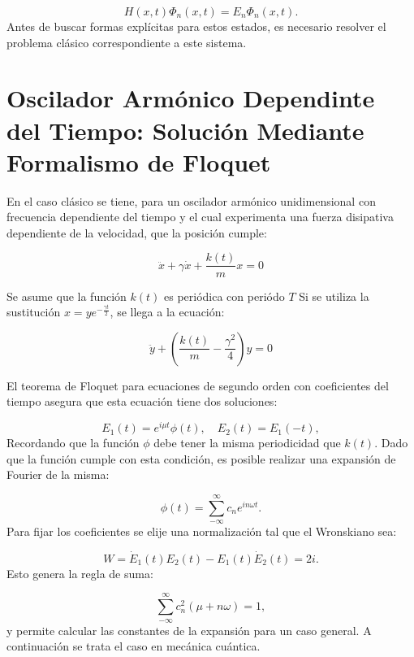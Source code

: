 \documentclass[a4paper,10pt]{report}
\begin{document}
\begin{equation}
H(x,t)\Phi_n(x,t)=E_n\Phi_n(x,t).
\end{equation} Antes de buscar formas explícitas para estos estados, es necesario resolver el problema clásico correspondiente a este sistema.

\section{Oscilador Armónico Dependinte del Tiempo: Solución Mediante Formalismo de Floquet}

En el caso clásico \cite{HanngiFM} se tiene, para un oscilador armónico unidimensional con frecuencia dependiente del tiempo y el cual experimenta una fuerza disipativa dependiente de la velocidad, que la posición cumple:

\begin{equation}
\ddot{x}+\gamma\dot{x}+\frac{k(t)}{m}x=0
\end{equation}

Se asume que la función $k(t)$ es periódica con periódo $T$ Si se utiliza la sustitución $x=ye^{-\frac{\gamma t}{2}}$, se llega a la ecuación:

\begin{equation}
\ddot{y} +(\frac{k(t)}{m}-\frac{\gamma^2}{4})y=0
\end{equation}

El teorema de Floquet para ecuaciones de segundo orden con coeficientes del tiempo \cite{HanngiFM} asegura que esta ecuación tiene dos soluciones:

\begin{equation}
E_1(t) = e^{i\mu t}\phi(t), \quad E_2(t)=E_1(-t),
\end{equation} Recordando que la función $\phi$ debe tener la misma periodicidad que $k(t)$. Dado que la función cumple con esta condición, es posible realizar una expansión de Fourier \cite{ArfkenMM} de la misma:

\begin{equation}
\phi(t) = \sum_{-\infty}^\infty c_n e^{in\omega t}.
\end{equation} Para fijar los coeficientes se elije una normalización tal que el Wronskiano sea:

\begin{equation}
W = \dot{E}_1(t)E_2(t)-E_1(t)\dot{E}_2(t) = 2i.
\end{equation}Esto genera la regla de suma:

\begin{equation}
\sum_{-\infty}^\infty c_n^2(\mu + n\omega) = 1,
\end{equation} y permite calcular las constantes de la expansión para un caso general. A continuación se trata el caso en mecánica cuántica.
\end{document}
